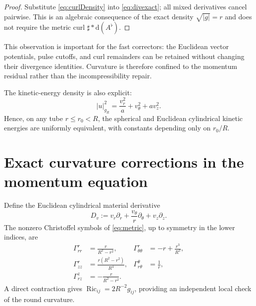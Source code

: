 \documentclass[aps,prd,reprint,superscriptaddress,nofootinbib,floatfix]{revtex4-2}
\theoremstyle{definition}
\theoremstyle{remark}
\newcommand{\dd}{\mathrm{d}}
\newcommand{\Ric}{\operatorname{Ric}}
\begin{document}
\begin{proof}
	Substitute \cref{eq:curlDensity} into \cref{eq:divexact}; all mixed derivatives cancel pairwise. This is an algebraic consequence of the exact density $\sqrt{|g|}=r$ and does not require the metric curl $\sharp *\dd(A^\flat)$.
\end{proof}

This observation is important for the fast correctors: the Euclidean vector potentials, pulse cutoffs, and curl remainders can be retained without changing their divergence identities. Curvature is therefore confined to the momentum residual rather than the incompressibility repair.

The kinetic-energy density is also explicit:
\begin{equation}
	|u|_{g_R}^2=\frac{v_r^2}{a}+v_\theta^2+a v_z^2.
	\label{eq:norm}
\end{equation}
Hence, on any tube $r\le r_0<R$, the spherical and Euclidean cylindrical kinetic energies are uniformly equivalent, with constants depending only on $r_0/R$.


\section{Exact curvature corrections in the momentum equation}\label{sec:momentum}

Define the Euclidean cylindrical material derivative
\begin{equation}
	D_v:=v_r\partial_r+\frac{v_\theta}{r}\partial_\theta+v_z\partial_z.
\end{equation}
The nonzero Christoffel symbols of \cref{eq:metric}, up to symmetry in the lower indices, are
\begin{align}
	\Gamma^r_{rr}           & =\frac{r}{R^2-r^2},           &
	\Gamma^r_{\theta\theta} & =-r+\frac{r^3}{R^2},\nonumber   \\
	\Gamma^r_{zz}           & =\frac{r(R^2-r^2)}{R^4},      &
	\Gamma^\theta_{r\theta} & =\frac1r,\nonumber              \\
	\Gamma^z_{rz}           & =-\frac{r}{R^2-r^2}.
	\label{eq:christoffel}
\end{align}
A direct contraction gives $\Ric_{ij}=2R^{-2}g_{ij}$, providing an independent local check of the round curvature.
\end{document}
